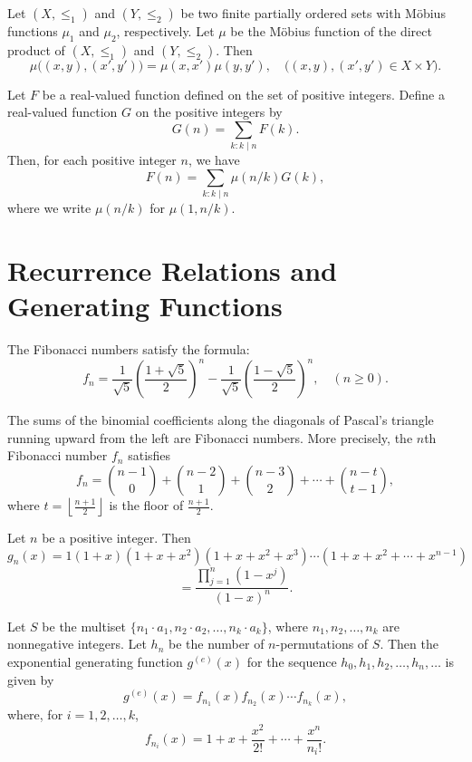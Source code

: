 \begin{theorem}
    \label{thm:6.6.3}
Let $(X, \leq_1)$ and $(Y, \leq_2)$ be two finite partially ordered sets with Möbius functions $\mu_1$ and $\mu_2$, respectively. Let $\mu$ be the Möbius function of the direct product of $(X, \leq_1)$ and $(Y, \leq_2)$. Then
\[
\mu\big((x, y), (x', y')\big) = \mu(x, x') \mu(y, y'), \quad \big((x, y), (x', y') \in X \times Y\big).
\tag{6.29}
\]
\end{theorem}

\begin{theorem}
    \label{thm:6.6.4}
Let $F$ be a real-valued function defined on the set of positive integers. Define a real-valued function $G$ on the positive integers by
\[
G(n) = \sum_{k : k \mid n} F(k).
\]
Then, for each positive integer $n$, we have
\[
F(n) = \sum_{k : k \mid n} \mu\left(n/k \right) G(k),
\]
where we write $\mu(n/k)$ for $\mu(1, n/k)$.
\end{theorem}

\chapter{Recurrence Relations and Generating Functions}
\begin{theorem}
 \label{thm:7.1.1}
The Fibonacci numbers satisfy the formula:
\[
f_n = \frac{1}{\sqrt{5}} \left( \frac{1 + \sqrt{5}}{2} \right)^n - \frac{1}{\sqrt{5}} \left( \frac{1 - \sqrt{5}}{2} \right)^n, \quad (n \geq 0).\tag{7.8}
\]
\end{theorem}


\begin{theorem}
 \label{thm:7.1.2}
The sums of the binomial coefficients along the diagonals of Pascal's triangle running upward from the left are Fibonacci numbers. More precisely, the $n$th Fibonacci number $f_n$ satisfies
\[
f_n = \binom{n-1}{0} + \binom{n-2}{1} + \binom{n-3}{2} + \cdots + \binom{n-t}{t-1},
\]
where $t = \left\lfloor \frac{n+1}{2} \right\rfloor$ is the floor of $\frac{n+1}{2}$.
\end{theorem}

\begin{theorem}
  \label{thm:7.2.1}
Let $n$ be a positive integer. Then
\[
g_n(x) = 1(1 + x)(1 + x + x^2)(1 + x + x^2 + x^3) \cdots (1 + x + x^2 + \cdots + x^{n-1})
\]
\[
= \frac{\prod_{j=1}^n (1 - x^j)}{(1 - x)^n}.\tag{7.14}
\]
\end{theorem}

\begin{theorem}
\label{thm:7.3.1}
 Let $S$ be the multiset $\{n_1 \cdot a_1, n_2 \cdot a_2, \dots, n_k \cdot a_k\}$, where $n_1, n_2, \dots, n_k$ are nonnegative integers. Let $h_n$ be the number of $n$-permutations of $S$. Then the exponential generating function $g^{(e)}(x)$ for the sequence $h_0, h_1, h_2, \dots, h_n, \dots$ is given by
\[
    g^{(e)}(x) = f_{n_1}(x) f_{n_2}(x) \cdots f_{n_k}(x), \tag{7.18}
\]
where, for $i = 1, 2, \dots, k$,
\[
    f_{n_i}(x) = 1 + x + \frac{x^2}{2!} + \cdots + \frac{x^n}{{n_i}!}. 
\]
\end{theorem}




